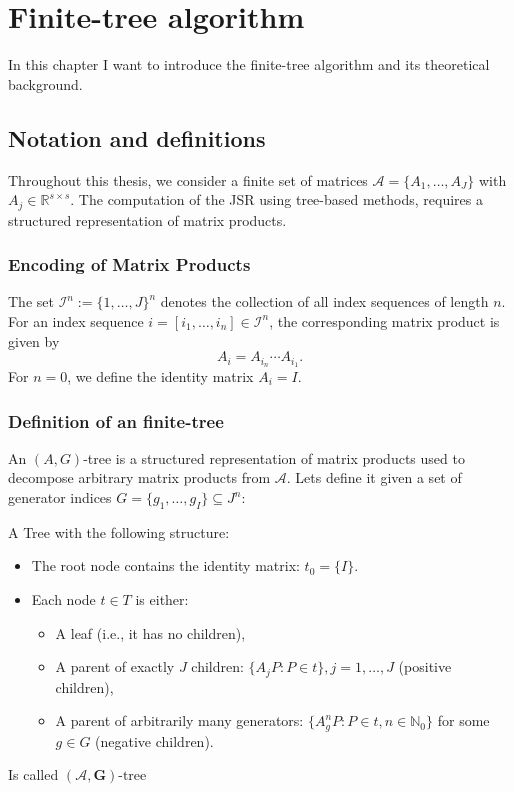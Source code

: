 
\chapter{Finite-tree algorithm}
\label{ch:finite-tree}
In this chapter I want to introduce the finite-tree algorithm and its theoretical background. 

\section{Notation and definitions}

Throughout this thesis, we consider a finite set of matrices \( \mathcal{A} = \{A_1, \dots, A_J\} \) with \( A_j \in \mathbb{R}^{s \times s} \). The computation of the JSR using tree-based methods, requires a structured representation of matrix products.

\subsection*{Encoding of Matrix Products}
The set \( \mathcal{I}^n := \{1, \dots, J\}^n \) denotes the collection of all index sequences of length \( n \). For an index sequence \( i = [i_1, \dots, i_n] \in \mathcal{I}^n \), the corresponding matrix product is given by
\[
    A_i = A_{i_n} \cdots A_{i_1}.
\]
For \( n = 0 \), we define the identity matrix \( A_i = I \).

\subsection*{Definition of an finite-tree}
\label{def:tree}
An \( (A,G) \)-tree is a structured representation of matrix products used to decompose arbitrary matrix products from $\mathcal{A}$. Lets define it given a set of generator indices \( G = \{g_1, \dots, g_I\} \subseteq J^n \):
\begin{definition}
    A Tree with the following structure: 
\begin{itemize}
    \item The root node contains the identity matrix: \( t_0 = \{I\} \).
    \item Each node \( t \in T \) is either:
    \begin{itemize}
        \item A leaf (i.e., it has no children),
        \item A parent of exactly \( J \) children: \( \{A_j P : P \in t\}, j = 1, \dots, J \) (positive children),
        \item A parent of arbitrarily many generators: \( \{A_g^n P : P \in t, n \in \mathbb{N}_0\} \) for some \( g \in G \) (negative children).
    \end{itemize}
\end{itemize}
Is called $(\mathcal{A},\mathbf{G})\text{-tree}$
\end{definition}

